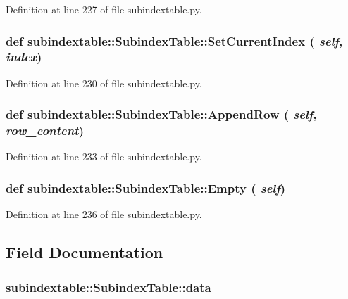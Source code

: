Definition at line 227 of file subindextable.py.\hypertarget{classsubindextable_1_1SubindexTable_725ea4673a2c4a5c8046e4ab6d292135}{
\subsubsection[SetCurrentIndex]{\setlength{\rightskip}{0pt plus 5cm}def subindextable::Subindex\-Table::Set\-Current\-Index ( {\em self},  {\em index})}}
\label{classsubindextable_1_1SubindexTable_725ea4673a2c4a5c8046e4ab6d292135}




Definition at line 230 of file subindextable.py.\hypertarget{classsubindextable_1_1SubindexTable_8706c1886ece48bf683b0e6ced4811c7}{
\subsubsection[AppendRow]{\setlength{\rightskip}{0pt plus 5cm}def subindextable::Subindex\-Table::Append\-Row ( {\em self},  {\em row\_\-content})}}
\label{classsubindextable_1_1SubindexTable_8706c1886ece48bf683b0e6ced4811c7}




Definition at line 233 of file subindextable.py.\hypertarget{classsubindextable_1_1SubindexTable_c3b7a0e42be4036c5f4131e6c38e1c78}{
\subsubsection[Empty]{\setlength{\rightskip}{0pt plus 5cm}def subindextable::Subindex\-Table::Empty ( {\em self})}}
\label{classsubindextable_1_1SubindexTable_c3b7a0e42be4036c5f4131e6c38e1c78}




Definition at line 236 of file subindextable.py.

\subsection{Field Documentation}
\hypertarget{classsubindextable_1_1SubindexTable_f7305b21e795d6e2203cd89dced09135}{
\subsubsection[data]{\setlength{\rightskip}{0pt plus 5cm}\hyperlink{classsubindextable_1_1SubindexTable_f7305b21e795d6e2203cd89dced09135}{subindextable::Subindex\-Table::data}}}
\label{classsubindextable_1_1SubindexTable_f7305b21e795d6e2203cd89dced09135}




